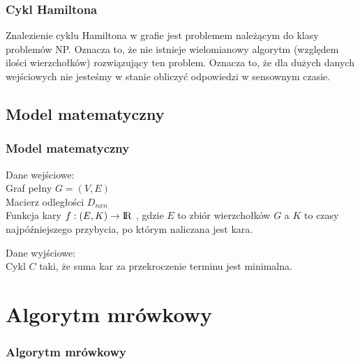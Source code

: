 \documentclass{beamer}
\begin{document}
\begin{frame}
\frametitle{Cykl Hamiltona}
Znalezienie cyklu Hamiltona w grafie jest problemem należącym do klasy problemów NP.
Oznacza to, że nie istnieje wielomianowy algorytm (względem ilości wierzchołków) rozwiązujący ten problem. Oznacza to, że dla dużych danych wejściowych nie jesteśmy w stanie obliczyć odpowiedzi w sensownym czasie.
\end{frame}

\subsection{Model matematyczny}
\begin{frame}
\frametitle{Model matematyczny}
Dane wejściowe: \\
Graf pełny $G=(V,E)$  \\
Macierz odległości $D_{nxn}$ \\
Funkcja kary $ f : (E,K) \rightarrow {\rm I\!R} $ , gdzie $E$ to zbiór wierzchołków $G$ a $K$ to czasy najpóźniejszego przybycia, po którym naliczana jest kara.

Dane wyjściowe: \\
Cykl $C$ taki, że suma kar za przekroczenie terminu jest minimalna.
\end{frame}





\section{Algorytm mrówkowy}

\begin{frame}
\frametitle{Algorytm mrówkowy}
\end{frame}
\end{document}
